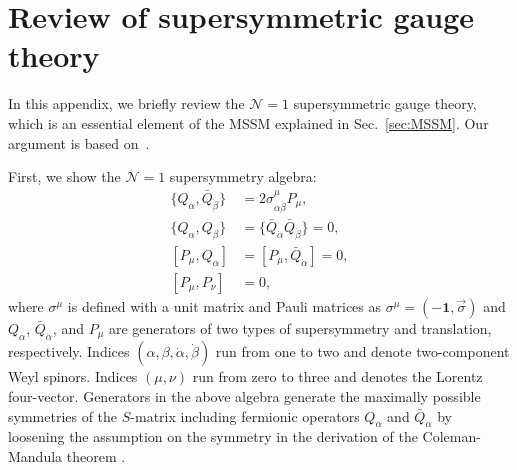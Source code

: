 \documentclass[12pt,twoside,book]{article}
\begin{document}
\section{Review of supersymmetric gauge theory}
\label{sec:susy}

\vskip 0.1in

In this appendix, we briefly review the $\mathcal{N}=1$ supersymmetric gauge theory, which is an essential element of the MSSM explained in Sec.~\ref{sec:MSSM}.
Our argument is based on~\cite{Wess:320631, Martin:1997ns}.

First, we show the $\mathcal{N} = 1$ supersymmetry algebra: \cite{Haag:1974qh}
\begin{align}
  \{ Q_\alpha, \bar{Q}_{\dot{\beta}} \} &= 2 \sigma_{\alpha
  \dot{\beta}}^\mu P_\mu,\label{QQbar} \\
  \{ Q_\alpha, Q_\beta \} &= \{ \bar{Q}_{\dot{\alpha}}
  \bar{Q}_{\dot{\beta}} \}  = 0,\label{QQQbarQbar} \\
  [ P_\mu, Q_\alpha ] &= [ P_\mu, \bar{Q}_{\dot{\alpha}} ] =
  0,\label{PQPQbar}\\
  [ P_\mu, P_\nu ] &= 0,\label{PP}
\end{align}
where $\sigma^\mu$ is defined with a unit matrix and Pauli matrices as $\sigma^\mu = (-\textbf{1},\vec{\sigma})$ and $Q_\alpha$, $\bar{Q}_{\dot{\alpha}}$, and $P_\mu$ are generators of two types of supersymmetry and translation, respectively.
Indices $(\alpha,\beta,\dot{\alpha},\dot{\beta})$ run from one to two and denote two-component Weyl spinors.
Indices $(\mu,\nu)$ run from zero to three and denotes the Lorentz four-vector.
Generators in the above algebra generate the maximally possible symmetries of the $S$-matrix including fermionic operators $Q_\alpha$ and $\bar{Q}_{\dot{\alpha}}$ by loosening the assumption on the symmetry in the derivation of the Coleman-Mandula theorem \cite{Coleman:1967ad}.
\end{document}
